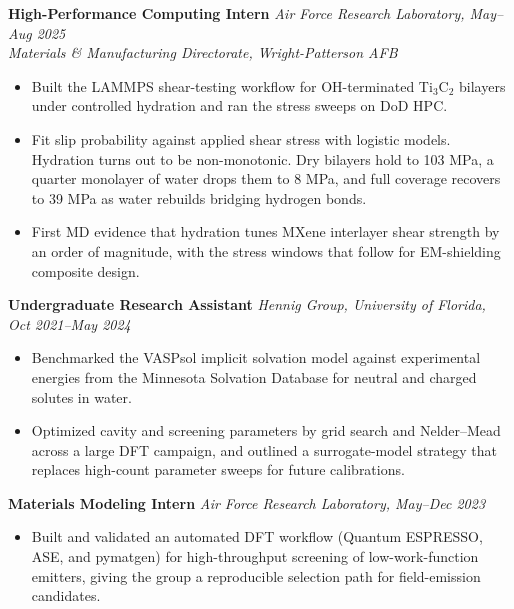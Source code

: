 \documentclass[letterpaper,10pt]{article}
\newcommand{\keep}{\needspace{4\baselineskip}}
\begin{document}
\keep\textbf{High-Performance Computing Intern} \hfill \textit{Air Force Research Laboratory, May--Aug 2025}\\
\textit{Materials \& Manufacturing Directorate, Wright-Patterson AFB}
\begin{itemize}
    \item Built the LAMMPS shear-testing workflow for OH-terminated Ti\(_3\)C\(_2\) bilayers under controlled hydration and ran the stress sweeps on DoD HPC.
    \item Fit slip probability against applied shear stress with logistic models. Hydration turns out to be non-monotonic. Dry bilayers hold to 103 MPa, a quarter monolayer of water drops them to 8 MPa, and full coverage recovers to 39 MPa as water rebuilds bridging hydrogen bonds.
    \item First MD evidence that hydration tunes MXene interlayer shear strength by an order of magnitude, with the stress windows that follow for EM-shielding composite design.
\end{itemize}

\keep\textbf{Undergraduate Research Assistant} \hfill \textit{Hennig Group, University of Florida, Oct 2021--May 2024}
\begin{itemize}
    \item Benchmarked the VASPsol implicit solvation model against experimental energies from the Minnesota Solvation Database for neutral and charged solutes in water.
    \item Optimized cavity and screening parameters by grid search and Nelder--Mead across a large DFT campaign, and outlined a surrogate-model strategy that replaces high-count parameter sweeps for future calibrations.
\end{itemize}

\keep\textbf{Materials Modeling Intern} \hfill \textit{Air Force Research Laboratory, May--Dec 2023}
\begin{itemize}
    \item Built and validated an automated DFT workflow (Quantum ESPRESSO, ASE, and pymatgen) for high-throughput screening of low-work-function emitters, giving the group a reproducible selection path for field-emission candidates.
\end{itemize}
\end{document}
